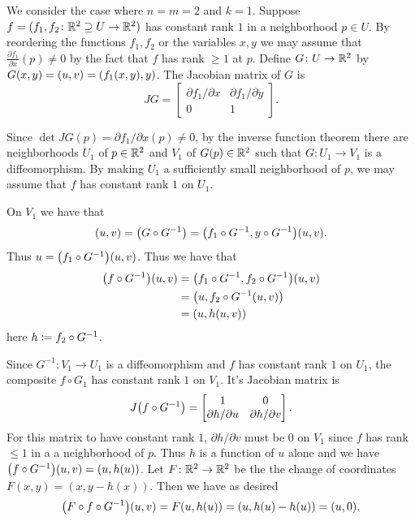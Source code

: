 \documentclass[letterpaper, 11pt, oneside]{book}
\begin{document}
\begin{pf}
  We consider the case where $n = m = 2$ and $k = 1$.
  Suppose $f = (f_{1}, f_{2}\colon \mathbb{R}^{2} \supseteq U \to \mathbb{R}^{2})$ has constant rank $1$ in a neighborhood $p \in U$.
  By reordering the functions $f_{1}, f_{2}$ or the variables $x, y$ we may assume that $\frac{\partial f_{1}}{\partial x}(p) \neq 0$ by the fact that $f$ has rank $\geq 1$ at $p$.
  Define $G\colon U \to \mathbb{R}^{2}$ by $G(x, y) = (u, v) = \pqty{f_{1}(x, y), y}$.
  The Jacobian matrix of $G$ is
  \[
    JG = \begin{bmatrix} \partial f_{1} / \partial x & \partial f_{1} / \partial y \\ 0 & 1 \end{bmatrix}.
  \]

  \clearpage

  Since $\det JG(p) = \partial f_{1} / \partial x (p) \neq 0$, by the inverse function theorem there are neighborhoods $U_{1}$ of $p \in \mathbb{R}^{2}$ and $V_{1}$ of $G(p) \in \mathbb{R}^{2}$ such that $G\colon U_{1} \to V_{1}$ is a diffeomorphism.
  By making $U_{1}$ a sufficiently small neighborhood of $p$, we may assume that $f$ has constant rank $1$ on $U_{1}$.

  On $V_{1}$ we have that
  \[
    (u, v) = \pqty{G \circ G^{-1}} = \pqty{f_{1} \circ G^{-1}, y \circ G^{-1}}(u, v).
  \]
  Thus $u = \pqty{f_{1} \circ G^{-1}}(u, v)$.
  Thus we have that
  \begin{align*}
    \pqty{f \circ G^{-1}}(u, v) &= \pqty{f_{1} \circ G^{-1}, f_{2} \circ G^{-1}}(u, v) \\
                                &= \pqty{u, f_{2} \circ G^{-1}(u, v)} \\
                                &= (u, h(u, v))
  \end{align*}
  here $h \coloneqq f_{2} \circ G^{-1}$.

  Since $G^{-1}\colon V_{1} \to U_{1}$ is a diffeomorphism and $f$ has constant rank $1$ on $U_{1}$, the composite $f \circ G_{1}$ has constant rank $1$ on $V_{1}$.
  It's Jacobian matrix is
  \[
    J\pqty{f \circ G^{-1}} = \begin{bmatrix} 1 & 0 \\ \partial h / \partial u & \partial h / \partial v \end{bmatrix}.
  \]
  For this matrix to have constant rank $1$, $\partial h / \partial v$ must be $0$ on $V_{1}$ since $f$ has rank $\leq 1$ in a a neighborhood of $p$.
  Thus $h$ is a function of $u$ alone and we have $\pqty{f \circ G^{-1}}(u, v) = (u, h(u))$.
  Let $F\colon \mathbb{R}^{2} \to \mathbb{R}^{2}$ be the the change of coordinates $F(x, y) = (x, y - h(x))$.
  Then we have as desired
  \[
    \pqty{F \circ f \circ G^{-1}}(u, v) = F(u, h(u)) = (u, h(u) - h(u)) = (u, 0).
  \]
\end{pf}
\end{document}
